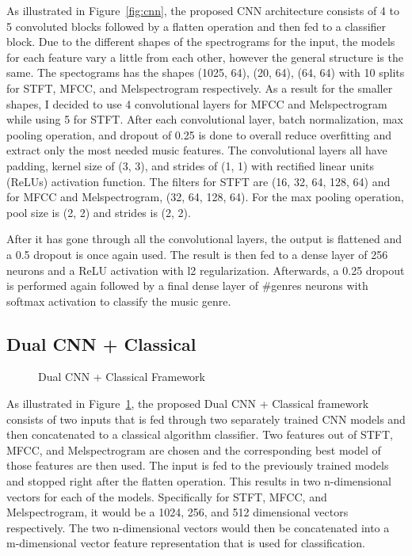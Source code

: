 \documentclass[10pt,twocolumn,letterpaper]{article}
\begin{document}
	As illustrated in Figure~\ref{fig:cnn}, the proposed CNN architecture consists of 4 to 5 convoluted blocks followed by a flatten operation and then fed to a classifier block. Due to the different shapes of the spectrograms for the input, the models for each feature vary a little from each other, however the general structure is the same. The spectograms has the shapes (1025, 64), (20, 64), (64, 64) with 10 splits for STFT, MFCC, and Melspectrogram respectively. As a result for the smaller shapes, I decided to use 4 convolutional layers for MFCC and Melspectrogram while using 5 for STFT. After each convolutional layer, batch normalization, max pooling operation, and dropout of 0.25 is done to overall reduce overfitting and extract only the most needed music features. The convolutional layers all have padding, kernel size of (3, 3), and strides of (1, 1) with rectified linear units (ReLUs) activation function. The filters for STFT are (16, 32, 64, 128, 64) and for MFCC and Melspectrogram, (32, 64, 128, 64). For the max pooling operation, pool size is (2, 2) and strides is (2, 2).
	
	After it has gone through all the convolutional layers, the output is flattened and a 0.5 dropout is once again used. The result is then fed to a dense layer of 256 neurons and a ReLU activation with l2 regularization. Afterwards, a 0.25 dropout is performed again followed by a final dense layer of \#genres neurons with softmax activation to classify the music genre.
	
	\subsection{Dual CNN + Classical} %
	
	\begin{figure}[!htpb]
		\centering
		\caption{Dual CNN + Classical Framework}
		\label{fig:dualcnnclassical}
	\end{figure}

	As illustrated in Figure~\ref{fig:dualcnnclassical}, the proposed Dual CNN + Classical framework consists of two inputs that is fed through two separately trained CNN models and then concatenated to a classical algorithm classifier. Two features out of STFT, MFCC, and Melspectrogram are chosen and the corresponding best model of those features are then used. The input is fed to the previously trained models and stopped right after the flatten operation. This results in two n-dimensional vectors for each of the models. Specifically for STFT, MFCC, and Melspectrogram, it would be a 1024, 256, and 512 dimensional vectors respectively. The two n-dimensional vectors would then be concatenated into a m-dimensional vector feature representation that is used for classification.
	
\end{document}
